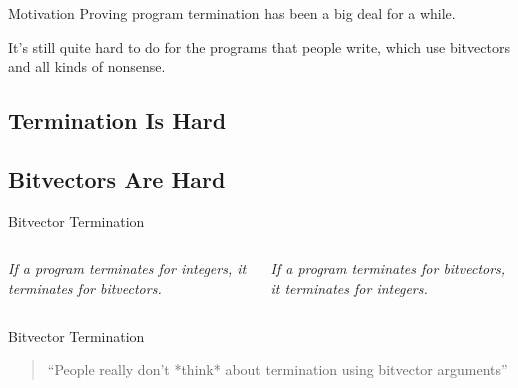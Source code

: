 \documentclass[xcolor=pdftex,t,11pt]{beamer}
\newcommand{\xmark}{\ding{55}}
\begin{document}
\begin{frame}{Motivation}
Proving program termination has been a big deal for a while.

\vspace{1em}

It's still quite hard to do for the programs that people write, which use bitvectors and all kinds of nonsense.
\end{frame}


\subsection{Termination Is Hard}


\subsection{Bitvectors Are Hard}

\begin{frame}[fragile]{Bitvector Termination}
 \begin{columns}[c]
  \emph{If a program terminates for integers, it terminates for bitvectors.}

  \uncover<2->{{\centering \color{red} \Huge \xmark
  
  }
  
  
  }

  \emph{If a program terminates for bitvectors, it terminates for integers.}

  \uncover<3->{{\centering \color{red} \Huge \xmark
  
  }
  
  
  }
 \end{columns}

 \vspace{1.5em}
 
 
\end{frame}


\begin{frame}{Bitvector Termination}
\begin{quote}
 ``People really don't *think* about termination using bitvector arguments''
   \hspace*{}
\end{quote}
\end{frame}
\end{document}

